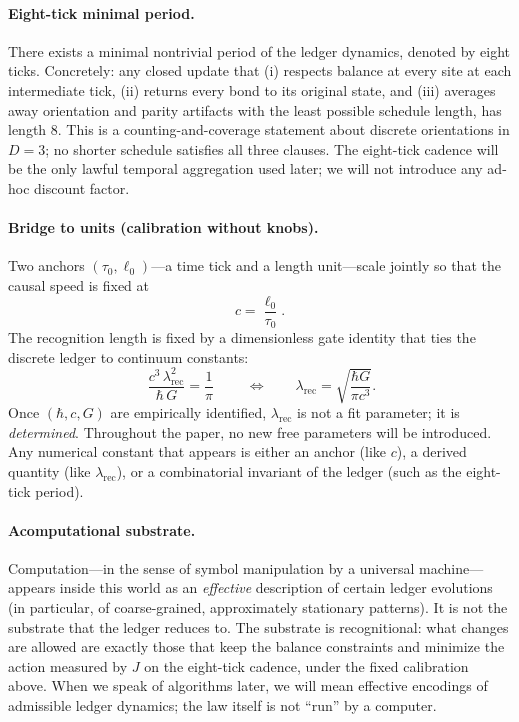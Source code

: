 \documentclass[11pt]{article}
\begin{document}
\paragraph{Eight-tick minimal period.}
There exists a minimal nontrivial period of the ledger dynamics, denoted by eight ticks. Concretely: any closed update that (i) respects balance at every site at each intermediate tick, (ii) returns every bond to its original state, and (iii) averages away orientation and parity artifacts with the least possible schedule length, has length $8$. This is a counting-and-coverage statement about discrete orientations in $D=3$; no shorter schedule satisfies all three clauses. The eight-tick cadence will be the only lawful temporal aggregation used later; we will not introduce any ad-hoc discount factor.

\paragraph{Bridge to units (calibration without knobs).}
Two anchors $(\tau_0,\ell_0)$—a time tick and a length unit—scale jointly so that the causal speed is fixed at
\[
c=\frac{\ell_0}{\tau_0}.
\]
The recognition length is fixed by a dimensionless gate identity that ties the discrete ledger to continuum constants:
\[
\boxed{\;\frac{c^3\,\lambda_{\mathrm{rec}}^2}{\hbar\,G}=\frac{1}{\pi}\;}\qquad \Longleftrightarrow \qquad
\lambda_{\mathrm{rec}}=\sqrt{\frac{\hbar G}{\pi c^3}}.
\]
Once $(\hbar,c,G)$ are empirically identified, $\lambda_{\mathrm{rec}}$ is not a fit parameter; it is \emph{determined}. Throughout the paper, no new free parameters will be introduced. Any numerical constant that appears is either an anchor (like $c$), a derived quantity (like $\lambda_{\mathrm{rec}}$), or a combinatorial invariant of the ledger (such as the eight-tick period).

\paragraph{Acomputational substrate.}
Computation—in the sense of symbol manipulation by a universal machine—appears inside this world as an \emph{effective} description of certain ledger evolutions (in particular, of coarse-grained, approximately stationary patterns). It is not the substrate that the ledger reduces to. The substrate is recognitional: what changes are allowed are exactly those that keep the balance constraints and minimize the action measured by $J$ on the eight-tick cadence, under the fixed calibration above. When we speak of algorithms later, we will mean effective encodings of admissible ledger dynamics; the law itself is not “run” by a computer.
\end{document}
